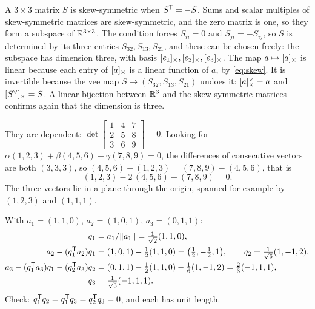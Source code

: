 \begin{solutions}
  \item A $3\times3$ matrix $S$ is skew-symmetric when $S^{\mathsf{T}} = -S$. Sums and scalar multiples of skew-symmetric matrices are
        skew-symmetric, and the zero matrix is one, so they form a subspace of $\mathbb{R}^{3\times3}$. The condition forces $S_{ii} = 0$
        and $S_{ji} = -S_{ij}$, so $S$ is determined by its three entries $S_{32}, S_{13}, S_{21}$, and these can be chosen
        freely: the subspace has dimension three, with basis $[e_1]_{\times}, [e_2]_{\times}, [e_3]_{\times}$. The map $a \mapsto [a]_{\times}$ is linear
        because each entry of $[a]_{\times}$ is a linear function of $a$, by \eqref{eq:skew}. It is invertible because the vee map
        $S \mapsto (S_{32}, S_{13}, S_{21})$ undoes it: $[a]_{\times}^{\vee} = a$ and $[S^{\vee}]_{\times} = S$. A linear bijection between
        $\mathbb{R}^3$ and the skew-symmetric matrices confirms again that the dimension is three.

  \item They are dependent: $\det\begin{bmatrix}1 & 4 & 7\\ 2 & 5 & 8\\ 3 & 6 & 9\end{bmatrix} = 0$. Looking for $\alpha(1,2,3) +
        \beta(4,5,6) + \gamma(7,8,9) = 0$, the differences of consecutive vectors are both $(3, 3, 3)$, so
        $(4,5,6) - (1,2,3) = (7,8,9) - (4,5,6)$, that is
        \[
          (1, 2, 3) - 2\,(4, 5, 6) + (7, 8, 9) = 0 .
        \]
        The three vectors lie in a plane through the origin, spanned for example by $(1,2,3)$ and $(1,1,1)$.

  \item With $a_1 = (1,1,0)$, $a_2 = (1,0,1)$, $a_3 = (0,1,1)$:
        \begin{align*}
          q_1 &= a_1/\|a_1\| = \tfrac{1}{\sqrt2}(1, 1, 0), \\
          a_2 - (q_1^{\mathsf{T}} a_2)q_1 &= (1,0,1) - \tfrac12(1,1,0) = \big(\tfrac12, -\tfrac12, 1\big), \qquad q_2 = \tfrac{1}{\sqrt6}(1, -1, 2), \\
          a_3 - (q_1^{\mathsf{T}} a_3)q_1 - (q_2^{\mathsf{T}} a_3)q_2 &= (0,1,1) - \tfrac12(1,1,0) - \tfrac16(1,-1,2) = \tfrac23(-1, 1, 1), \\
          q_3 &= \tfrac{1}{\sqrt3}(-1, 1, 1).
        \end{align*}
        Check: $q_1^{\mathsf{T}} q_2 = q_1^{\mathsf{T}} q_3 = q_2^{\mathsf{T}} q_3 = 0$, and each has unit length.


\end{solutions}
